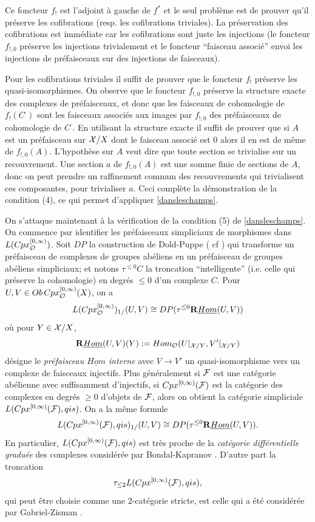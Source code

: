 \documentclass[12pt]{article}
\newcommand{\Ff}{{\cal F}}
\newcommand{\Oo}{{\cal O}}
\newcommand{\Xx}{{\cal X}}
\begin{document}
Ce foncteur $f_!$ est l'adjoint \`a gauche de $f^{\ast}$ et 
le seul probl\`eme est
de prouver qu'il pr\'eserve les cofibrations (resp. les cofibrations 
triviales).
La pr\'eservation des cofibrations est imm\'ediate car les cofibrations sont 
juste
les injections (le foncteur $f_{!,0}$ pr\'eserve les injections trivialement
et le foncteur ``faisceau associ\'e'' envoi les injections de pr\'efaisceaux
sur des injections de faisceaux). 

Pour les cofibrations triviales il suffit de
prouver que le foncteur $f_{!}$ pr\'eserve les quasi-isomorphismes. 
On observe que le foncteur
$f_{!,0}$ pr\'eserve la structure exacte des complexes de pr\'efaisceaux, 
et donc
que les faisceaux de cohomologie de $f_{!}(C^{\cdot})$ sont  les faisceaux
associ\'es aux images par $f_{!,0}$ des pr\'efaisceaux de cohomologie de
$C^{\cdot}$. En utilisant la structure exacte il suffit de prouver que si $A$
est un pr\'efaisceau sur $\Xx /X$ dont le faisceau associ\'e est $0$
alors il en est de m\^eme de $f_{!,0}(A)$. L'hypoth\`ese sur $A$ veut dire
que toute section se trivialise sur un recouvrement. Une section $a$ de
$f_{!,0}(A)$ est une somme finie de sections de $A$, donc on peut prendre 
un raffinement commun des recouvrements qui trivialisent ces composantes,
pour trivialiser $a$.  Ceci compl\`ete la d\'emonstration de la condition (4),
ce qui permet d'appliquer \ref{dansleschamps}.



On s'attaque maintenant \`a la v\'erification de la condition (5)
de \ref{dansleschamps}.
On commence par identifier les pr\'efaisceaux simpliciaux de morphismes
dans $L(Cpx_{\Oo}^{[0, \infty )})$. Soit $DP$ la
construction de Dold-Puppe (\cite{DoldPuppe} cf \cite{Illusie}) qui
transforme un
pr\'efaisceau de complexes de groupes ab\'eliens en un pr\'efaisceau
de groupes ab\'eliens
simpliciaux; et notons $\tau ^{\leq 0} C$ la troncation ``intelligente''
(i.e. celle
qui pr\'eserve la cohomologie)  en degr\'es $\leq 0$ d'un complexe $C$.
Pour
$U,V\in Ob\,Cpx_{\Oo}^{[0, \infty )}(X)$, on a
$$
L(Cpx_{\Oo}^{[0, \infty )})_{1/}(U,V)
\cong DP(\tau ^{\leq 0} {\bf R} \underline{Hom} (U,V))
$$
o\`u pour $Y\in \Xx /X$,
$$
{\bf R} \underline{Hom} (U,V)(Y):=
Hom _{\Oo}(U|_{\Xx /Y}, V'|_{\Xx /Y})
$$
d\'esigne
le {\em pr\'efaisceau $\underline{Hom}$ interne} avec $V\rightarrow V'$ un
quasi-isomorphisme vers un complexe de faisceaux injectifs.
Plus g\'en\'eralement si $\Ff$ est une cat\'egorie ab\'elienne avec suffisamment
d'injectifs, si $Cpx^{[0, \infty )}(\Ff )$ est la cat\'egorie des complexes
en degr\'es $\geq 0$ d'objets de $\Ff$, alors on obtient la cat\'egorie
simpliciale $L(Cpx^{[0, \infty )}(\Ff ), qis)$. On a la m\^eme formule
$$
L(Cpx^{[0, \infty )}(\Ff ), qis)_{1/}(U,V)
\cong DP(\tau ^{\leq 0} {\bf R} \underline{Hom} (U,V)).
$$
En particulier, $L(Cpx^{[0, \infty )}(\Ff ), qis)$ est tr\`es proche
de la {\em cat\'egorie diff\'erentielle gradu\'ee} des complexes consid\'er\'ee
par Bondal-Kapranov \cite{BondalKapranov}. D'autre part la troncation
$$
\tau _{\leq 2} L(Cpx^{[0, \infty )}(\Ff ), qis),
$$
qui peut \^etre choisie comme
une $2$-cat\'egorie stricte, est celle qui a \'et\'e consid\'er\'ee par
Gabriel-Zisman \cite{GabrielZisman}.
\end{document}
